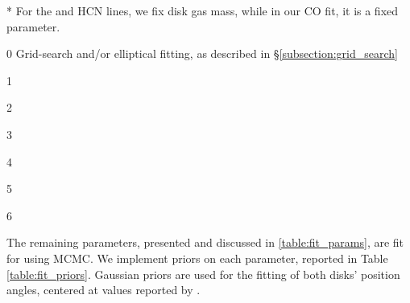 \begin{table}
\begin{threeparttable}
    \begin{tablenotes}\footnotesize
      \item[*] For the \hco and HCN lines, we fix disk gas mass, while in our CO fit, it is a fixed parameter.
      \item[0] Grid-search and/or elliptical fitting, as described in \S\ref{subsection:grid_search}
      \item[1] \citet{Williams2014}
      \item[2] \citet{Flaherty2015}
      \item[3] \citet{GaiaCollaboration2018}
      \item[4] \citet{Andrews2009}
      \item[5] \citet{Factor2017}
      \item[6] \citet{Qi2011}
    \end{tablenotes}
  \end{threeparttable}
\end{table}


The remaining parameters, presented and discussed in \ref{table:fit_params}, are fit for using MCMC. We implement priors on each parameter, reported in Table \ref{table:fit_priors}. Gaussian priors are used for the fitting of both disks' position angles, centered at values reported by \cite{Williams2014}.

